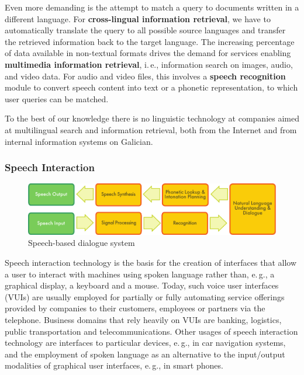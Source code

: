 \begin{multicols}{2}

Even more demanding is the attempt to match a query to documents written in a different language. For \textbf{cross-lingual information retrieval}, we have to automatically translate the query to all possible source languages and transfer the retrieved information back to the target language. The increasing percentage of data available in non-textual formats drives the demand for services enabling \textbf{multimedia information retrieval}, i.\,e., information search on images, audio, and video data. For audio and video files, this involves a \textbf{speech recognition} module to convert speech content into text or a phonetic representation, to which user queries can be matched.

To the best of our knowledge there is no linguistic technology at companies aimed at multilingual search and information retrieval, both from the Internet and from internal information systems on Galician.  


\subsubsection{Speech Interaction}

\begin{figure}[htb]
  \center
  \includegraphics[width=\textwidth]{../_media/english/simple_speech-based_dialogue_architecture}
  \caption{Speech-based dialogue system}
  \label{fig:dialoguearch_en}
\end{figure}

Speech interaction technology is the basis for the creation of interfaces that allow a user to interact with machines using spoken language rather than, e.\,g., a graphical display, a keyboard and a mouse. Today, such voice user interfaces (VUIs) are usually employed for partially or fully automating service offerings provided by companies to their customers, employees or partners via the telephone. Business domains that rely heavily on VUIs are banking, logistics, public transportation and telecommunications. Other usages of speech interaction technology are interfaces to particular devices, e.\,g., in car navigation systems, and the employment of spoken language as an alternative to the input/output modalities of graphical user interfaces, e.\,g., in smart phones.


\end{multicols}
